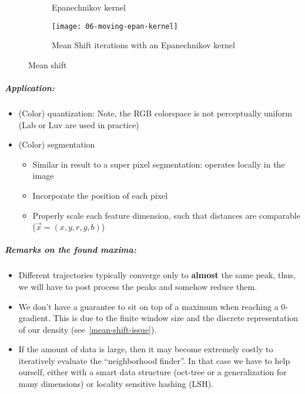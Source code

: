 \begin{figure}[H]
  \centering
  \begin{subfigure}[c]{0.4\textwidth}
    \centering
    
    \caption{Epanechnikov kernel}
  \end{subfigure}
  \hfill
  \begin{subfigure}[c]{0.4\textwidth}
    \centering
    \texttt{[image: 06-moving-epan-kernel]}
    \caption{Mean Shift iterations with an Epanechnikov kernel}
  \end{subfigure}
  \caption{Mean shift}
\end{figure}

\subparagraph{Application:}
\begin{itemize}
  \item (Color) quantization: Note, the RGB colorspace is not perceptually uniform (Lab or Luv are used in practice)
  \item (Color) segmentation
    \begin{itemize}
      \item Similar in result to a super pixel segmentation: operates locally in the image
      \item Incorporate the position of each pixel
      \item Properly scale each feature dimension, such that distances are comparable (\eg $\vec{x} = (x,y,r,g,b)$)
    \end{itemize}
\end{itemize}

\subparagraph{Remarks on the found maxima:}
\begin{itemize}
  \item Different trajectories typically converge only to \textbf{almost} the same peak, thus, we will have to post process the peaks and somehow reduce them.
  \item We don't have a guarantee to sit on top of a maximum when reaching a 0-gradient. This is due to the finite window size and the discrete representation of our density (see~\cref{mean-shift-issue}).
  \item \label{mean-shift-cost-effectiveness} If the amount of data is large, then it may become extremely costly to iteratively evaluate the ``neighborhood finder''. In that case we have to help ourself, either with a smart data structure (oct-tree or a generalization for many dimensions) or locality sensitive hashing (LSH).
\end{itemize}
